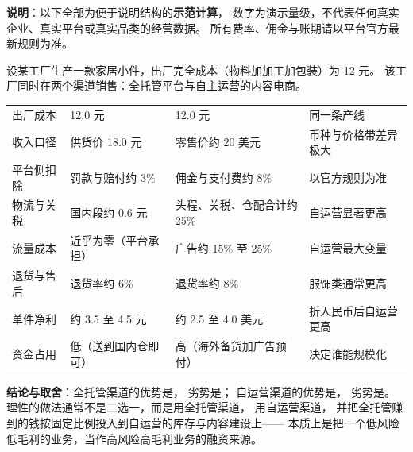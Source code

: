 \begin{casebox}
\textbf{说明}：以下全部为便于说明结构的\textbf{示范计算}，
数字为演示量级，不代表任何真实企业、真实平台或真实品类的经营数据。
所有费率、佣金与账期请以平台官方最新规则为准。

设某工厂生产一款家居小件，出厂完全成本（物料加加工加包装）为 12 元。
该工厂同时在两个渠道销售：全托管平台与自主运营的内容电商。

\begin{center}
\small
\begin{tabularx}{\linewidth}{L{2.6cm} L{3.1cm} L{3.4cm} Y}
\toprule
{} &  &  &  \\
\midrule
出厂成本 & 12.0 元 & 12.0 元 & 同一条产线 \\
\addlinespace
收入口径 & 供货价 18.0 元 & 零售价约 20 美元 & 币种与价格带差异极大 \\
\addlinespace
平台侧扣除 & 罚款与赔付约 3\% & 佣金与支付费约 8\% & 以官方规则为准 \\
\addlinespace
物流与关税 & 国内段约 0.6 元 & 头程、关税、仓配合计约 25\% & 自运营显著更高 \\
\addlinespace
流量成本 & 近乎为零（平台承担） & 广告约 15\% 至 25\% & 自运营最大变量 \\
\addlinespace
退货与售后 & 退货率约 6\% & 退货率约 8\% & 服饰类通常更高 \\
\addlinespace
单件净利 & 约 3.5 至 4.5 元 & 约 2.5 至 4.0 美元 & 折人民币后自运营更高 \\
\addlinespace
资金占用 & 低（送到国内仓即可） & 高（海外备货加广告预付） & 决定谁能规模化 \\
\bottomrule
\end{tabularx}
\label{tab:case-dual}
\end{center}

\textbf{结论与取舍}：全托管渠道的优势是，
劣势是；
自运营渠道的优势是，
劣势是。
理性的做法通常不是二选一，而是用全托管渠道，
用自运营渠道，
并把全托管赚到的钱按固定比例投入到自运营的库存与内容建设上——
本质上是把一个低风险低毛利的业务，当作高风险高毛利业务的融资来源。
\end{casebox}


